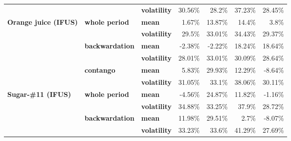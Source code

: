 \documentclass[
  authoryear,
  preprint,
  3p]{elsarticle}
\begin{document}
\begin{longtable}[t]{>{}l>{}l>{}l>{}r>{}r>{}r>{}r}
\textbf{} & \textbf{} & \textbf{volatility} & \textcolor[HTML]{4285f4}{30.56\%} & \textcolor[HTML]{4285f4}{28.2\%} & \textcolor[HTML]{4285f4}{37.23\%} & \textcolor[HTML]{4285f4}{28.45\%}\\
\textbf{Orange juice (IFUS)} & \textbf{whole period} & \textbf{mean} & \textcolor[HTML]{4285f4}{1.67\%} & \textcolor[HTML]{4285f4}{13.87\%} & \textcolor[HTML]{4285f4}{14.4\%} & \textcolor[HTML]{4285f4}{3.8\%}\\
\textbf{} & \textbf{} & \textbf{volatility} & \textcolor[HTML]{4285f4}{29.5\%} & \textcolor[HTML]{4285f4}{33.01\%} & \textcolor[HTML]{4285f4}{34.43\%} & \textcolor[HTML]{4285f4}{29.37\%}\\
\addlinespace
\textbf{} & \textbf{backwardation} & \textbf{mean} & \textcolor[HTML]{4285f4}{-2.38\%} & \textcolor[HTML]{4285f4}{-2.22\%} & \textcolor[HTML]{4285f4}{18.24\%} & \textcolor[HTML]{4285f4}{18.64\%}\\
\textbf{} & \textbf{} & \textbf{volatility} & \textcolor[HTML]{4285f4}{28.01\%} & \textcolor[HTML]{4285f4}{33.01\%} & \textcolor[HTML]{4285f4}{30.09\%} & \textcolor[HTML]{4285f4}{28.64\%}\\
\textbf{} & \textbf{contango} & \textbf{mean} & \textcolor[HTML]{4285f4}{5.83\%} & \textcolor[HTML]{4285f4}{29.93\%} & \textcolor[HTML]{4285f4}{12.29\%} & \textcolor[HTML]{4285f4}{-8.64\%}\\
\textbf{} & \textbf{} & \textbf{volatility} & \textcolor[HTML]{4285f4}{31.05\%} & \textcolor[HTML]{4285f4}{33.1\%} & \textcolor[HTML]{4285f4}{38.06\%} & \textcolor[HTML]{4285f4}{30.11\%}\\
\textbf{Sugar-\#11 (IFUS)} & \textbf{whole period} & \textbf{mean} & \textcolor[HTML]{4285f4}{-4.56\%} & \textcolor[HTML]{4285f4}{24.87\%} & \textcolor[HTML]{4285f4}{11.82\%} & \textcolor[HTML]{4285f4}{-1.16\%}\\
\addlinespace
\textbf{} & \textbf{} & \textbf{volatility} & \textcolor[HTML]{4285f4}{34.88\%} & \textcolor[HTML]{4285f4}{33.25\%} & \textcolor[HTML]{4285f4}{37.9\%} & \textcolor[HTML]{4285f4}{28.72\%}\\
\textbf{} & \textbf{backwardation} & \textbf{mean} & \textcolor[HTML]{4285f4}{11.98\%} & \textcolor[HTML]{4285f4}{29.51\%} & \textcolor[HTML]{4285f4}{2.7\%} & \textcolor[HTML]{4285f4}{-8.07\%}\\
\textbf{} & \textbf{} & \textbf{volatility} & \textcolor[HTML]{4285f4}{33.23\%} & \textcolor[HTML]{4285f4}{33.6\%} & \textcolor[HTML]{4285f4}{41.29\%} & \textcolor[HTML]{4285f4}{27.69\%}\\

\end{longtable}
\end{document}
